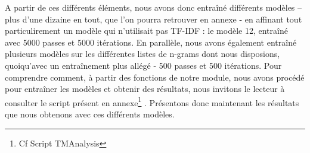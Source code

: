 \documentclass[letterpaper,portrait,12pt]{article}
\begin{document}
	A partir de ces diff\'{e}rents \'{e}l\'{e}ments, nous avons donc entra\^{i}n\'{e} diff\'{e}rents mod\`{e}les -- plus d'une dizaine en tout, que l'on pourra retrouver en annexe - en affinant tout particulirement un mod\`{e}le qui n'utilisait pas TF-IDF : le mod\`{e}le 12, entra\^{i}n\'{e} avec 5000 passes et 5000 it\'{e}rations. En parall\`{e}le, nous avons \'{e}galement entra\^{i}n\'{e} plusieurs mod\`{e}les sur les diff\'{e}rentes listes de n-grams dont nous disposions, quoiqu'avec un entra\^{i}nement plus all\'{e}g\'{e} - 500 passes et 500 it\'{e}rations. Pour comprendre comment, \`{a} partir des fonctions de notre module, nous avons proc\'{e}d\'{e} pour entra\^{i}ner les mod\`{e}les et obtenir des r\'{e}sultats, nous invitons le lecteur \`{a} consulter le script pr\'{e}sent en annexe\footnote{	Cf Script TMAnalysis} . Pr\'{e}sentons donc maintenant les r\'{e}sultats que nous obtenons avec ces diff\'{e}rents mod\`{e}les.
\end{document}

